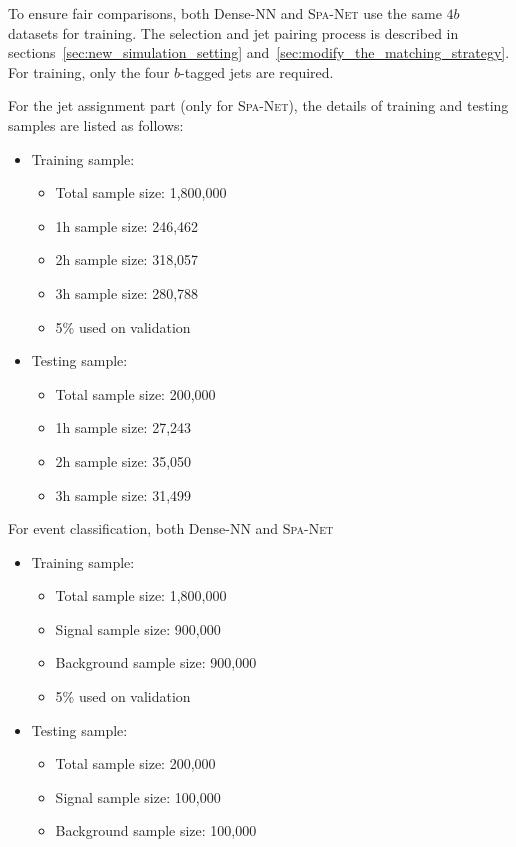 \documentclass[12pt]{article}
\begin{document}
        To ensure fair comparisons, both Dense-NN and \textsc{Spa-Net} use the same $4b$ datasets for training. The selection and jet pairing process is described in sections~\ref{sec:new_simulation_setting} and~\ref{sec:modify_the_matching_strategy}. For training, only the four $b$-tagged jets are required.

        For the jet assignment part (only for \textsc{Spa-Net}), the details of training and testing samples are listed as follows:

        \begin{itemize}
            \item Training sample:
            \begin{itemize}
                \item Total sample size: 1,800,000
                \item 1h sample size: 246,462
                \item 2h sample size: 318,057
                \item 3h sample size: 280,788
                \item 5\% used on validation
            \end{itemize}
            \item Testing sample:
            \begin{itemize}
                \item Total sample size: 200,000
                \item 1h sample size: 27,243
                \item 2h sample size: 35,050
                \item 3h sample size: 31,499
            \end{itemize}
        \end{itemize}

        For event classification, both Dense-NN and \textsc{Spa-Net}
        \begin{itemize}
            \item Training sample:
            \begin{itemize}
                \item Total sample size: 1,800,000
                \item Signal sample size: 900,000
                \item Background sample size: 900,000
                \item 5\% used on validation
            \end{itemize}
            \item Testing sample:
            \begin{itemize}
                \item Total sample size: 200,000
                \item Signal sample size: 100,000
                \item Background sample size: 100,000
            \end{itemize}
        \end{itemize}
\end{document}
